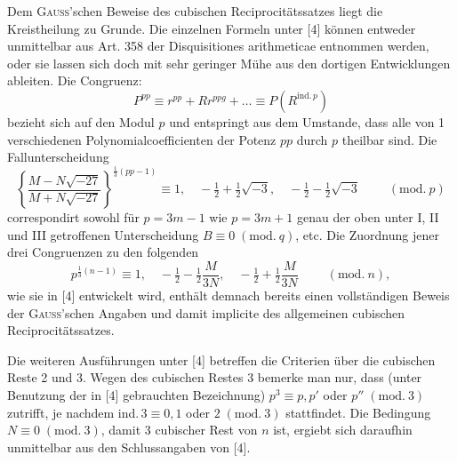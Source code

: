 Dem \textsc{Gauss}'schen Beweise des cubischen Reciprocitätssatzes liegt die Kreistheilung zu Grunde. Die
einzelnen Formeln unter [4] können entweder unmittelbar aus Art. 358 der Disquisitiones arithmeticae entnommen werden, oder sie lassen sich doch mit sehr geringer Mühe aus den dortigen Entwicklungen ableiten.
Die Congruenz:
\[
P^{pp}\equiv r^{pp}+Rr^{ppg}+\ldots\equiv P(R^{\mathrm{ind.}\,p})
\]
bezieht sich auf den Modul $p$ und entspringt aus dem Umstande, dass alle von 1 verschiedenen Polynomialcoefficienten der Potenz $pp$ durch $p$ theilbar sind. Die Fallunterscheidung
\[
\left\{\dfrac{M-N\sqrt{-27}}{M+N\sqrt{-27}}\right\}^{\frac13(pp-1)}\equiv 1,\quad -\tfrac12+\tfrac12\sqrt{-3},\quad -\tfrac12-\tfrac12\sqrt{-3}\qquad\;(\mathrm{mod.}\ p)
\]
correspondirt sowohl für $p=3m-1$ wie $p=3m+1$ genau der oben unter I, II und III getroffenen
Unterscheidung $B\equiv 0\;(\mathrm{mod.}\ q)$, etc. Die Zuordnung jener drei Congruenzen zu den folgenden
\[
p^{\frac13(n-1)}\equiv 1,\quad -\tfrac12-\tfrac12\dfrac{M}{3N},\quad -\tfrac12+\tfrac12\dfrac{M}{3N}\qquad\;(\mathrm{mod.}\ n),
\]
wie sie in [4] entwickelt wird, enthält demnach bereits einen vollständigen Beweis der \textsc{Gauss}'schen Angaben
und damit implicite des allgemeinen cubischen Reciprocitätssatzes.

Die weiteren Ausführungen unter [4] betreffen die Criterien über die cubischen Reste 2 und 3.
Wegen des cubischen Restes 3 bemerke man nur, dass (unter Benutzung der in [4] gebrauchten Bezeichnung)
$p^3\equiv p, p'$ oder $p''\;(\mathrm{mod.}\ 3)$ zutrifft, je nachdem ind.\,$3\equiv 0, 1$ oder $2\;(\mathrm{mod.}\ 3)$ stattfindet. Die Bedingung
$N\equiv 0\;(\mathrm{mod.}\ 3)$, damit 3 cubischer Rest von $n$ ist, ergiebt sich daraufhin unmittelbar aus den Schlussangaben von [4].

